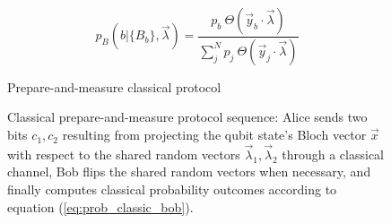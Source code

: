 \begin{equation}\label{eq:prob_classic_bob}
p_B(b|\{B_b\},\vec{\lambda}) = \frac{p_b\ \Theta(\vec{y}_b \cdot \vec{\lambda})}{\sum_{j}^{N}p_j\ \Theta(\vec{y}_j \cdot \vec{\lambda})}
\end{equation}

\begin{figure}[tb]
\begin{center}
\begin{msc}[msc keyword=, instance width=3.6cm]{Prepare-and-measure classical protocol}
\nextlevel[3]
\nextlevel[3]
\nextlevel[1]
\nextlevel[3]
\nextlevel[2]
\end{msc}
\end{center}
\caption{Classical prepare-and-measure protocol sequence: Alice sends two bits $c_1, c_2$ resulting from projecting the qubit state's Bloch vector $\vec{x}$ with respect to the shared random vectors $\vec{\lambda}_1, \vec{\lambda}_2$ through a classical channel, Bob flips the shared random vectors when necessary, and finally computes classical probability outcomes according to equation (\ref{eq:prob_classic_bob}).}
\label{fig:msc_pm}
\end{figure}



